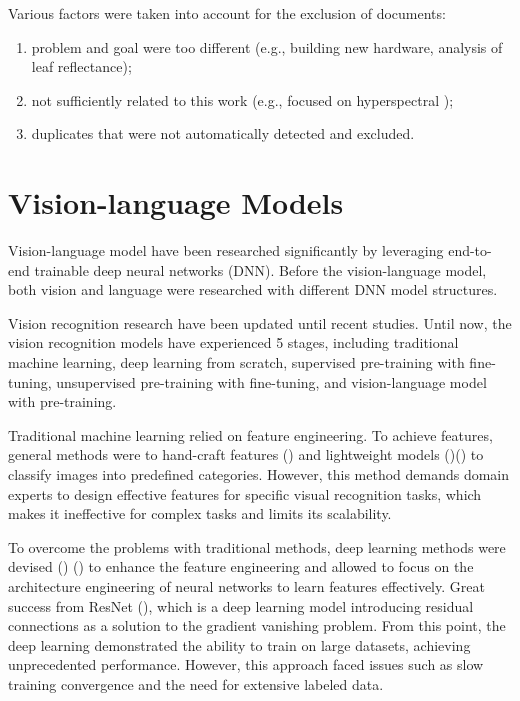 Various factors were taken into account for the exclusion of documents:
\begin{enumerate}
    \item problem and goal were too different (e.g., building new hardware, analysis of leaf reflectance);
    \item not sufficiently related to this work (e.g., focused on hyperspectral );
    \item duplicates that were not automatically detected and excluded.
\end{enumerate}


\section{Vision-language Models}
Vision-language model have been researched significantly by leveraging end-to-end trainable deep neural networks (DNN). Before the vision-language model, both vision and language were researched with different DNN model structures. 

Vision recognition research have been updated until recent studies. Until now, the vision recognition models have experienced 5 stages, including traditional machine learning, deep learning from scratch, supervised pre-training with fine-tuning, unsupervised pre-training with fine-tuning, and vision-language model with pre-training.

Traditional machine learning relied on feature engineering. To achieve features, general methods were to hand-craft features (\cite{svmclassification}) and lightweight models (\cite{knn})(\cite{svm}) to classify images into predefined categories. However, this method demands domain experts to design effective features for specific visual recognition tasks, which makes it ineffective for complex tasks and limits its scalability.

To overcome the problems with traditional methods, deep learning methods were devised (\cite{imagenet}) (\cite{dnn_imagerecognition}) to enhance the feature engineering and allowed to focus on the architecture engineering of neural networks to learn features effectively.
Great success from ResNet (\cite{resnet}), which is a deep learning model introducing residual connections as a solution to the gradient vanishing problem. From this point, the deep learning demonstrated the ability to train on large datasets, achieving unprecedented performance. However, this approach faced issues such as slow training convergence and the need for extensive labeled data. 

